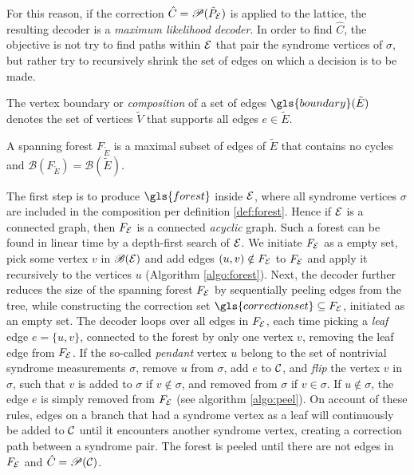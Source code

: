 For this reason, if the correction $\hat{C}=\mathscr{P}(\tilde{P}_{\mathcal{E}})$ is applied to the lattice, the resulting decoder is a \emph{maximum likelihood decoder}. In order to find $\hat{C}$, the objective is not try to find paths within $\mathcal{E}$ that pair the syndrome vertices of $\sigma$, but rather try to recursively shrink the set of edges on which a decision is to be made.
\begin{definition}\label{def:boundaryofedges}
  The vertex boundary or \emph{composition} of a set of edges $\gls{boundary}(\tilde{E})$ denotes the set of vertices $\tilde{V}$ that supports all edges $e\in \tilde{E}$.
\end{definition}
\begin{definition}\label{def:forest}
  A spanning forest $F_{\tilde{E}}$ is a maximal subset of edges of $\tilde{E}$ that contains no cycles and $\mathscr{B}(F_{\tilde{E}}) = \mathscr{B}(\tilde{E})$.
\end{definition}
The first step  is to produce $\gls{forest}$ inside $\mathcal{E}$, where all syndrome vertices $\sigma$ are included in the composition per definition \ref{def:forest}. Hence if $\mathcal{E}$ is a connected graph, then $F_{\mathcal{E}}$ is a connected \emph{acyclic} graph. Such a forest can be found in linear time by a depth-first search of $\mathcal{E}$. We initiate $F_{\mathcal{E}}$ as a empty set, pick some vertex $v$ in $\mathscr{B}(\mathcal{E})$ and add edges $(u,v)\notin F_{\mathcal{E}}$ to $F_{\mathcal{E}}$ and apply it recursively to the vertices $u$ (Algorithm \ref{algo:forest}). Next, the decoder further reduces the size of the spanning forest $F_{\mathcal{E}}$ by sequentially peeling edges from the tree, while constructing the correction set $\gls{correctionset}\subseteq F_\m{E}$, initiated as an empty set. The decoder loops over all edges in $F_{\mathcal{E}}$, each time picking a \emph{leaf} edge $e = \{u,v\}$, connected to the forest by only one vertex $v$, removing the leaf edge from $F_{\mathcal{E}}$. If the so-called \emph{pendant} vertex $u$ belong to the set of nontrivial syndrome measurements $\sigma$, remove $u$ from $\sigma$, add $e$ to $\mathcal{C}$, and \emph{flip} the vertex $v$ in $\sigma$, such that $v$ is added to $\sigma$ if $v \notin \sigma$, and removed from $\sigma$ if $v\in\sigma$.  If $u\notin\sigma$, the edge $e$ is simply removed from $F_{\mathcal{E}}$ (see algorithm \ref{algo:peel}). On account of these rules, edges on a branch that had a syndrome vertex as a leaf will continuously be added to $\mathcal{C}$ until it encounters another syndrome vertex, creating a correction path between a syndrome pair. The forest is peeled until there are not edges in $F_{\mathcal{E}}$ and $\hat{C}=\mathscr{P}(\mathcal{C})$.

